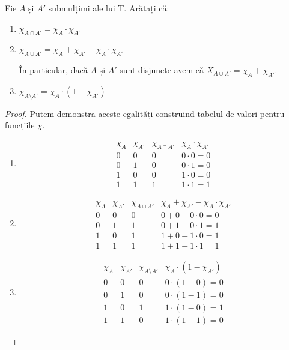 \begin{exercise}
Fie \(A\) și \(A'\) submulțimi ale lui T. Arătați că:
\begin{enumerate}
    \item \(\chi_{A \cap {A'}} = \chi_A \cdot \chi_{A'}\)
    \item \(\chi_{A \cup {A'}} = \chi_A + \chi_{A'} - \chi_A \cdot \chi_{A'}\)

    În particular, dacă \(A\) și \(A'\) sunt disjuncte avem că \(X_{A \cup {A'}} = \chi_A + \chi_{A'}\).
    \item \(\chi_{A \setminus A'} = \chi_A \cdot (1 - \chi_{A'})\)
\end{enumerate}
\end{exercise}
\begin{proof}
Putem demonstra aceste egalități construind tabelul de valori pentru funcțiile \(\chi\).
\begin{enumerate}
    \item
    \[
    \begin{array}{cccc}
        \chi_A & \chi_{A'} & \chi_{A \cap A'} & \chi_A \cdot \chi_{A'} \\
        0 & 0 & 0 & 0 \cdot 0 = 0 \\
        0 & 1 & 0 & 0 \cdot 1 = 0 \\
        1 & 0 & 0 & 1 \cdot 0 = 0 \\
        1 & 1 & 1 & 1 \cdot 1 = 1
    \end{array}
    \]

    \item
    \[
    \begin{array}{cccc}
         \chi_A & \chi_{A'} & \chi_{A \cup A'} & \chi_A + \chi_{A'} - \chi_A \cdot \chi_{A'}  \\
         0 & 0 & 0 & 0 + 0 - 0 \cdot 0 = 0 \\
         0 & 1 & 1 & 0 + 1 - 0 \cdot 1 = 1 \\
         1 & 0 & 1 & 1 + 0 - 1 \cdot 0 = 1 \\
         1 & 1 & 1 & 1 + 1 - 1 \cdot 1 = 1
    \end{array}
    \]

    \item
    \[
    \begin{array}{cccc}
         \chi_A & \chi_{A'} & \chi_{A \setminus A'} & \chi_A \cdot (1 - \chi_{A'})  \\
         0 & 0 & 0 & 0 \cdot (1 - 0) = 0 \\
         0 & 1 & 0 & 0 \cdot (1 - 1) = 0 \\
         1 & 0 & 1 & 1 \cdot (1 - 0) = 1 \\
         1 & 1 & 0 & 1 \cdot (1 - 1) = 0
    \end{array}
    \]
\end{enumerate}
\end{proof}

